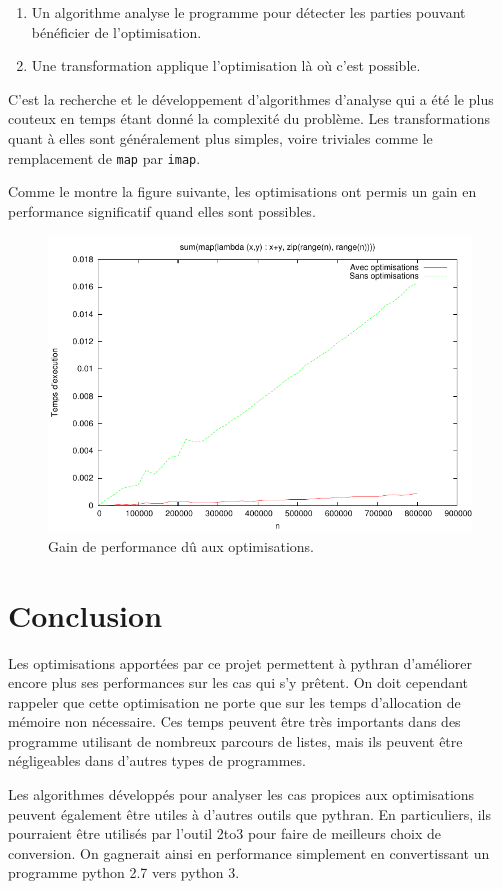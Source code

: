\documentclass[a4paper]{article}
\begin{document}
\begin{enumerate}
\item Un algorithme analyse le programme pour détecter les parties
  pouvant bénéficier de l'optimisation.
\item Une transformation applique l'optimisation là où c'est possible.
\end{enumerate}

C'est la recherche et le développement d'algorithmes d'analyse qui a
été le plus couteux en temps étant donné la complexité du
problème. Les transformations quant à elles sont généralement plus
simples, voire triviales comme le remplacement de \texttt{map} par
\texttt{imap}.

Comme le montre la figure suivante, les optimisations ont permis un
gain en performance significatif quand elles sont possibles.

\begin{figure}[h]
  \includegraphics[width=\textwidth]{perf_optimization}
  \caption{Gain de performance dû aux optimisations.}
\end{figure}


\section*{Conclusion}

Les optimisations apportées par ce projet permettent à pythran
d'améliorer encore plus ses performances sur les cas qui s'y
prêtent. On doit cependant rappeler que cette optimisation ne porte
que sur les temps d'allocation de mémoire non nécessaire. Ces temps
peuvent être très importants dans des programme utilisant de nombreux
parcours de listes, mais ils peuvent être négligeables dans d'autres
types de programmes.

Les algorithmes développés pour analyser les cas propices aux
optimisations peuvent également être utiles à d'autres outils que
pythran. En particuliers, ils pourraient être utilisés par l'outil
2to3 pour faire de meilleurs choix de conversion. On gagnerait ainsi
en performance simplement en convertissant un programme python 2.7
vers python 3.
\end{document}
